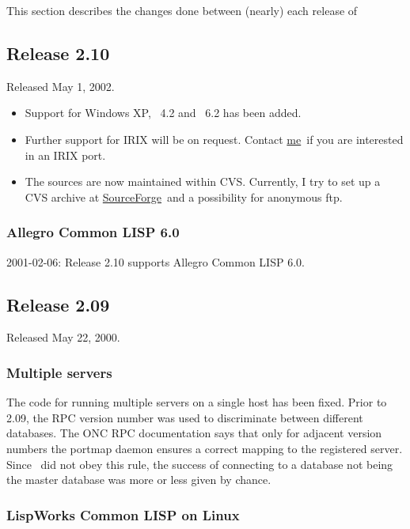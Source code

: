 This section describes the changes done between (nearly) each release
of \plob

\subsection{Release 2.10}

Released May 1, 2002.

\begin{itemize}
  
\item Support for Windows XP, \lwcl\ 4.2 and \allegrocl\ 6.2 has been
  added.
  
\item Further support for IRIX will be on request. Contact
  \href{mailto:\thisemail}{me}\ if you are interested in an IRIX port.
  
\item The sources are now maintained within CVS. Currently, I try to
  set up a CVS archive at \href{http:\thisproject}{SourceForge}\ and a
  possibility for anonymous ftp.

\end{itemize}

\subsubsection{Allegro Common LISP 6.0}

2001-02-06: Release 2.10 supports Allegro Common LISP 6.0.

\subsection{Release 2.09}

Released May 22, 2000.

\subsubsection{Multiple servers}

The code for running multiple servers on a single host has been fixed.
Prior to 2.09, the RPC version number was used to discriminate between
different databases. The ONC RPC documentation says that only for
adjacent version numbers the portmap daemon ensures a correct mapping
to the registered server. Since \plob\ did not obey this rule, the
success of connecting to a database not being the master database
was more or less given by chance.

\subsubsection{LispWorks Common LISP on Linux}

